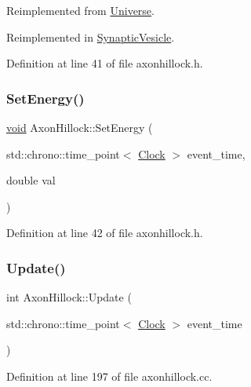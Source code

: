 Reimplemented from \mbox{\hyperlink{class_universe_aa22202ae740eb1355529afcb13285e91}{Universe}}.



Reimplemented in \mbox{\hyperlink{class_synaptic_vesicle_a7fd7cfce5eccb904206d968866f85220}{Synaptic\+Vesicle}}.



Definition at line 41 of file axonhillock.\+h.

\mbox{\label{class_axon_hillock_a830afd18810e0eaa11a9e7a500b8f0c4}} 
\subsubsection{\texorpdfstring{Set\+Energy()}{SetEnergy()}}
{\footnotesize\ttfamily \mbox{\hyperlink{glad_8h_a950fc91edb4504f62f1c577bf4727c29}{void}} Axon\+Hillock\+::\+Set\+Energy (\begin{DoxyParamCaption}\item[{std\+::chrono\+::time\+\_\+point$<$ \mbox{\hyperlink{universe_8h_a0ef8d951d1ca5ab3cfaf7ab4c7a6fd80}{Clock}} $>$}]{event\+\_\+time,  }\item[{double}]{val }\end{DoxyParamCaption})\hspace{0.3cm}{\ttfamily [inline]}}



Definition at line 42 of file axonhillock.\+h.

\mbox{\label{class_axon_hillock_a5a6a6a93a98b32c303b9ee6320c09909}} 
\subsubsection{\texorpdfstring{Update()}{Update()}}
{\footnotesize\ttfamily int Axon\+Hillock\+::\+Update (\begin{DoxyParamCaption}\item[{std\+::chrono\+::time\+\_\+point$<$ \mbox{\hyperlink{universe_8h_a0ef8d951d1ca5ab3cfaf7ab4c7a6fd80}{Clock}} $>$}]{event\+\_\+time }\end{DoxyParamCaption})}



Definition at line 197 of file axonhillock.\+cc.

